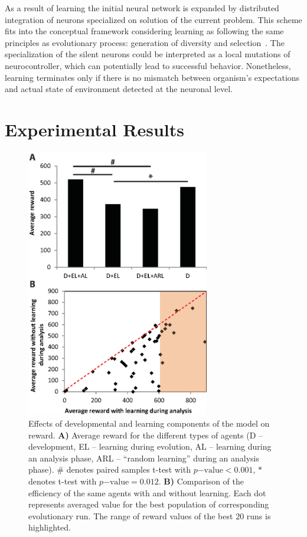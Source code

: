 \documentclass[letterpaper]{article}
\begin{document}
As a result of learning the initial neural network is expanded by distributed integration of neurons specialized on solution of the current problem. This scheme fits into the conceptual framework considering learning as following the same principles as evolutionary process: generation of diversity and selection~\citep{Burtsev2008,burtsev2012adaptive}. The specialization of the silent neurons could be interpreted as a local mutations of neurocontroller, which can potentially lead to successful behavior. Nonetheless, learning terminates only if there is no mismatch between organism's expectations and actual state of environment detected at the neuronal level.      

\section{Experimental Results}

\begin{figure}[!b]
	\begin{center}
	\includegraphics[width=8cm]{Fig2_Efficiency_analysis.eps}
	\caption{Effects of developmental and learning components of the model on reward. \textbf{A)} Average reward for the different types of agents (D -- development, EL -- learning during evolution, AL -- learning during an analysis phase, ARL -- ``random learning'' during an analysis phase). $\#$ denotes paired samples t-test with $p\mathrm{-value}<0.001$, $*$ denotes t-test with $p\mathrm{-value}=0.012$. \textbf{B)} Comparison of the efficiency of the same agents with and  without learning. Each dot represents averaged value for the best population of corresponding evolutionary run. The range of reward values of the best $20$ runs is highlighted.}
	\label{Efficiency_analysis}
	\end{center}
\end{figure}
\end{document}
